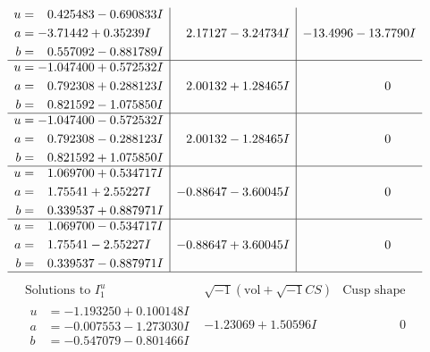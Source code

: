 \documentclass[1p]{elsarticle_modified}
\theoremstyle{definition}
\newcommand{\I}{\sqrt{-1}}
\begin{document}
$$\begin{array}{c|c|c}
\begin{aligned}
u &= \phantom{-}0.425483 - 0.690833 I \\
a &= -3.71442 + 0.35239 I \\
b &= \phantom{-}0.557092 - 0.881789 I\end{aligned}
 & \phantom{-}2.17127 - 3.24734 I & -13.4996 - 13.7790 I \\ \hline\begin{aligned}
u &= -1.047400 + 0.572532 I \\
a &= \phantom{-}0.792308 + 0.288123 I \\
b &= \phantom{-}0.821592 - 1.075850 I\end{aligned}
 & \phantom{-}2.00132 + 1.28465 I & \phantom{-0.000000 } 0 \\ \hline\begin{aligned}
u &= -1.047400 - 0.572532 I \\
a &= \phantom{-}0.792308 - 0.288123 I \\
b &= \phantom{-}0.821592 + 1.075850 I\end{aligned}
 & \phantom{-}2.00132 - 1.28465 I & \phantom{-0.000000 } 0 \\ \hline\begin{aligned}
u &= \phantom{-}1.069700 + 0.534717 I \\
a &= \phantom{-}1.75541 + 2.55227 I \\
b &= \phantom{-}0.339537 + 0.887971 I\end{aligned}
 & -0.88647 - 3.60045 I & \phantom{-0.000000 } 0 \\ \hline\begin{aligned}
u &= \phantom{-}1.069700 - 0.534717 I \\
a &= \phantom{-}1.75541 - 2.55227 I \\
b &= \phantom{-}0.339537 - 0.887971 I\end{aligned}
 & -0.88647 + 3.60045 I & \phantom{-0.000000 } 0\\
 \hline 
 \end{array}$$\newpage$$\begin{array}{c|c|c}  
\text{Solutions to }I^u_{1}& \I (\text{vol} + \sqrt{-1}CS) & \text{Cusp shape}\\
 \hline 
\begin{aligned}
u &= -1.193250 + 0.100148 I \\
a &= -0.007553 - 1.273030 I \\
b &= -0.547079 - 0.801466 I\end{aligned}
 & -1.23069 + 1.50596 I & \phantom{-0.000000 } 0 \\ \hline\begin{aligned}

\end{aligned}
\end{array}$$
\end{document}
